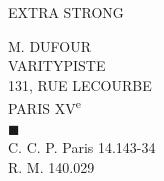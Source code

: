EXTRA STRONG



\begin{flushright}
M. DUFOUR\\
VARITYPISTE\\
131, RUE LECOURBE\\
PARIS XV\textsuperscript{e}\\
$\blacksquare$\\
C. C. P. Paris 14.143-34\\
R. M. 140.029
\end{flushright}

